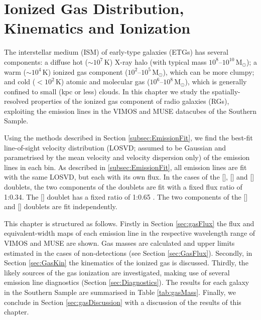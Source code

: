 \chapter{Ionized Gas Distribution, Kinematics and Ionization}
	\label{cha:gas}
The interstellar medium (ISM) of early-type galaxies (ETGs) has several components: a diffuse hot ($\sim 10^7 \, \mathrm{K}$) X-ray halo (with typical mass $10^8$--$10^{10} \, \mathrm{M_\odot}$); a warm ($\sim 10^4 \, \mathrm{K}$) ionized gas component ($10^2$--$10^5 \, \mathrm{M_\odot}$), which can be more clumpy; and cold ($<10^2 \, \mathrm{K}$) atomic and molecular gas ($10^6$--$10^8 \, \mathrm{M_\odot}$), which is generally confined to small (kpc or less) clouds. In this chapter we study the spatially-resolved properties of the ionized gas component of radio galaxies (RGs), exploiting the emission lines in the VIMOS and MUSE datacubes of the Southern Sample.

Using the methods described in Section \ref{subsec:EmissionFit}, we find the best-fit line-of-sight velocity distribution (LOSVD; assumed to be Gaussian and parametrised by the mean velocity and velocity dispersion only) of the emission lines in each bin. As described in \ref{subsec:EmissionFit}, all emission lines are fit with the same LOSVD, but each with its own flux. In the cases of the [], [] and [] doublets, the two components of the doublets are fit with a fixed flux ratio of 1:0.34. The [] doublet has a fixed ratio of 1:0.65 \citep{Safier1992}. The two components of the [] and [] doublets are fit independently.

This chapter is structured as follows. Firstly in Section \ref{sec:gasFlux} the flux and equivalent-width maps of each emission line in the respective wavelength range of VIMOS and MUSE are shown. Gas masses are calculated and upper limits estimated in the cases of non-detections (see Section \ref{sec:GasFlux}). Secondly, in Section \ref{sec:GasKin} the kinematics of the ionized gas is discussed. Thirdly, the likely sources of the gas ionization are investigated, making use of several emission line diagnostics (Section \ref{sec:Diagnostics}). The results for each galaxy in the Southern Sample are summarised in Table \ref{tab:gasMass}. Finally, we conclude in Section \ref{sec:gasDiscussion} with a discussion of the results of this chapter.


